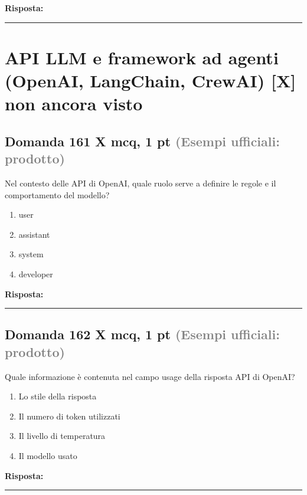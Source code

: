 \documentclass[a4paper,11pt]{article}
\begin{document}
\vspace{0.2cm}
\noindent\textbf{Risposta:}\par
\vspace{4cm}\hrule


\section{API LLM e framework ad agenti (OpenAI, LangChain, CrewAI) [X] non ancora visto}

\subsection*{Domanda 161 X \hfill {\small mcq, 1 pt \textcolor{gray}{(Esempi ufficiali: prodotto)}}}
Nel contesto delle API di OpenAI, quale ruolo serve a definire le regole e il comportamento del modello?

\begin{enumerate}[label=\alph*)]
\item user
\item assistant
\item system
\item developer
\end{enumerate}
\vspace{0.2cm}
\noindent\textbf{Risposta:}\par
\vspace{1.5cm}\hrule


\subsection*{Domanda 162 X \hfill {\small mcq, 1 pt \textcolor{gray}{(Esempi ufficiali: prodotto)}}}
Quale informazione è contenuta nel campo usage della risposta API di OpenAI?

\begin{enumerate}[label=\alph*)]
\item Lo stile della risposta
\item Il numero di token utilizzati
\item Il livello di temperatura
\item Il modello usato
\end{enumerate}
\vspace{0.2cm}
\noindent\textbf{Risposta:}\par
\vspace{1.5cm}\hrule


\end{document}
